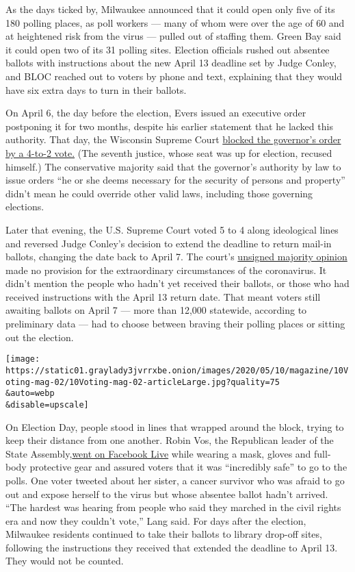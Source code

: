 As the days ticked by, Milwaukee announced that it could open only five
of its 180 polling places, as poll workers --- many of whom were over
the age of 60 and at heightened risk from the virus --- pulled out of
staffing them. Green Bay said it could open two of its 31 polling sites.
Election officials rushed out absentee ballots with instructions about
the new April 13 deadline set by Judge Conley, and BLOC reached out to
voters by phone and text, explaining that they would have six extra days
to turn in their ballots.

On April 6, the day before the election, Evers issued an executive order
postponing it for two months, despite his earlier statement that he
lacked this authority. That day, the Wisconsin Supreme Court
\href{https://www.wicourts.gov/news/docs/2020AP608_2.pdf}{blocked the
governor's order by a 4-to-2 vote.} (The seventh justice, whose seat was
up for election, recused himself.) The conservative majority said that
the governor's authority by law to issue orders ``he or she deems
necessary for the security of persons and property'' didn't mean he
could override other valid laws, including those governing elections.

Later that evening, the U.S. Supreme Court voted 5 to 4 along
ideological lines and reversed Judge Conley's decision to extend the
deadline to return mail-in ballots, changing the date back to April 7.
The court's
\href{https://www.supremecourt.gov/opinions/19pdf/19a1016_o759.pdf}{unsigned
majority opinion} made no provision for the extraordinary circumstances
of the coronavirus. It didn't mention the people who hadn't yet received
their ballots, or those who had received instructions with the April 13
return date. That meant voters still awaiting ballots on April 7 ---
more than 12,000 statewide, according to preliminary data --- had to
choose between braving their polling places or sitting out the election.

\texttt{[image: https://static01.graylady3jvrrxbe.onion/images/2020/05/10/magazine/10Voting-mag-02/10Voting-mag-02-articleLarge.jpg?quality=75\\\&auto=webp\\\&disable=upscale]}

On Election Day, people stood in lines that wrapped around the block,
trying to keep their distance from one another. Robin Vos, the
Republican leader of the State
Assembly,\href{https://www.facebookcorewwwi.onion/watch/?v=519791292264353}{went
on Facebook Live} while wearing a mask, gloves and full-body protective
gear and assured voters that it was ``incredibly safe'' to go to the
polls. One voter tweeted about her sister, a cancer survivor who was
afraid to go out and expose herself to the virus but whose absentee
ballot hadn't arrived. ``The hardest was hearing from people who said
they marched in the civil rights era and now they couldn't vote,'' Lang
said. For days after the election, Milwaukee residents continued to take
their ballots to library drop-off sites, following the instructions they
received that extended the deadline to April 13. They would not be
counted.

